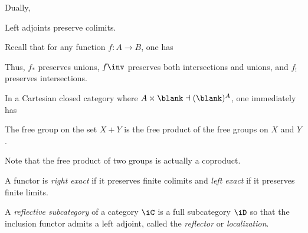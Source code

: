 \documentclass{amsart}
\begin{document}
Dually,

\begin{lem}
  Left adjoints preserve colimits.
\end{lem}

\begin{cor}
  Recall that for any function $f : A \to B$, one has
  
  Thus, $f_{*}$ preserves unions, $f\inv$ preserves both intersections and unions, and $f_{!}$ preserves intersections.
\end{cor}

In a Cartesian closed category where $A \times \blank \dashv (\blank)^{A}$, one immediately has

\begin{cor}
  The free group on the set $X + Y$ is the free product of the free groups on $X$ and $Y$.
\end{cor}

Note that the free product of two groups is actually a coproduct.

\begin{defn}
  A functor is \emph{right exact} if it preserves finite colimits and \emph{left exact} if it preserves finite limits.
\end{defn}

\begin{defn}
  A \emph{reflective subcategory} of a category $\iC$ is a full subcategory $\iD$ so that the inclusion functor admits a left adjoint, called the \emph{reflector} or \emph{localization}.
  
\end{defn}
\end{document}
